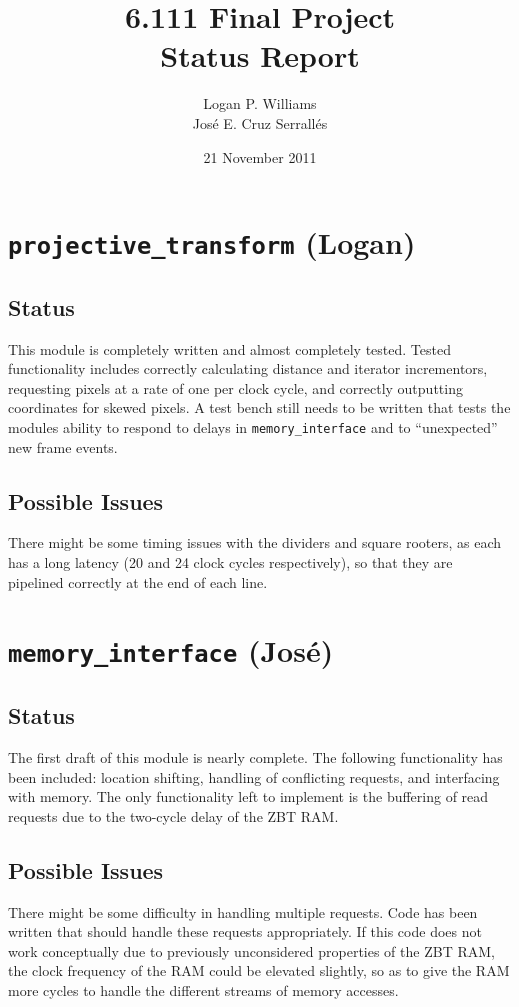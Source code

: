 \documentclass{article}
\title{6.111 Final Project\\Status Report}
\author{Logan P. Williams\\Jos\'{e} E. Cruz Serrall\'{e}s}
\date{21 November 2011}
\begin{document}
\maketitle


\section{{\tt projective\_transform} (Logan)}
\subsection{Status} This module is completely written and almost completely tested. Tested functionality includes correctly calculating distance and iterator incrementors, requesting pixels at a rate of one per clock cycle, and correctly outputting coordinates for skewed pixels. A test bench still needs to be written that tests the modules ability to respond to delays in {\tt memory\_interface} and to ``unexpected'' new frame events.
\subsection{Possible Issues} There might be some timing issues with the dividers and square rooters, as each has a long latency (20 and 24 clock cycles respectively), so that they are pipelined correctly at the end of each line.

\section{{\tt memory\_interface} (Jos\'{e})}
\subsection{Status} The first draft of this module is nearly complete. The following functionality has been included: location shifting, handling of conflicting requests, and interfacing with memory. The only functionality left to implement is the buffering of read requests due to the two-cycle delay of the ZBT RAM. 
\subsection{Possible Issues} There might be some difficulty in handling multiple requests. Code has been written that should handle these requests appropriately. If this code does not work conceptually due to previously unconsidered properties of the ZBT RAM, the clock frequency of the RAM could be elevated slightly, so as to give the RAM more cycles to handle the different streams of memory accesses.
\end{document}
